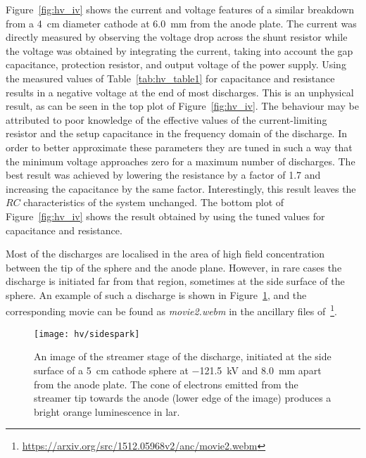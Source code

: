Figure~\ref{fig:hv_iv} shows the current and voltage features of a similar breakdown from a \SI{4}{\centi\metre} diameter cathode at \SI{6.0}{\milli\metre} from the anode plate.
The current was directly measured by observing the voltage drop across the shunt resistor while the voltage was obtained by integrating the current, taking into account the gap capacitance, protection resistor, and output voltage of the power supply.
Using the measured values of Table~\ref{tab:hv_table1} for capacitance and resistance results in a negative voltage at the end of most discharges.
This is an unphysical result, as can be seen in the top plot of Figure~\ref{fig:hv_iv}.
The behaviour may be attributed to poor knowledge of the effective values of the current-limiting resistor and the setup capacitance in the frequency domain of the discharge.
In order to better approximate these parameters they are tuned in such a way that the minimum voltage approaches zero for a maximum number of discharges.
The best result was achieved by lowering the resistance by a factor of \num{1.7} and increasing the capacitance by the same factor.
Interestingly, this result leaves the $RC$ characteristics of the system unchanged.
The bottom plot of Figure~\ref{fig:hv_iv} shows the result obtained by using the tuned values for capacitance and resistance.

Most of the discharges are localised in the area of high field concentration between the tip of the sphere and the anode plane.
However, in rare cases the discharge is initiated far from that region, sometimes at the side surface of the sphere.
An example of such a discharge is shown in Figure~\ref{fig:hv_side}, and the corresponding movie can be found as \emph{movie2.webm} in the ancillary files of~\cite{breakdown_16}\footnote{\url{https://arxiv.org/src/1512.05968v2/anc/movie2.webm}}.

\begin{figure}[htb]
	\centering	
	\texttt{[image: hv/sidespark]}
	\caption[ test streamer image]{%
		An image of the streamer stage of the discharge, initiated at the side surface of a \SI{5}{\centi\metre} cathode sphere at \SI{-121.5}{\kilo\volt} and \SI{8.0}{\milli\metre} apart from the anode plate.
		The cone of electrons emitted from the streamer tip towards the anode (lower edge of the image) produces a bright orange luminescence in \acrshort{lar}.
	}
	\label{fig:hv_side}
\end{figure}

